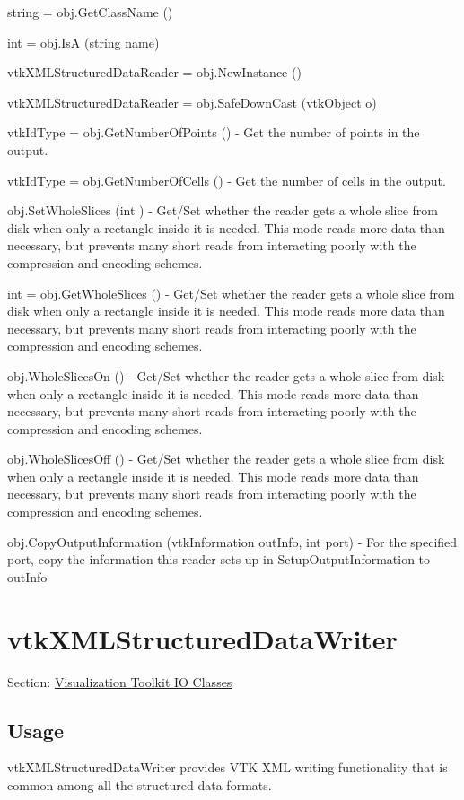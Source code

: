 \begin{DoxyItemize}
\item {\ttfamily string = obj.\-Get\-Class\-Name ()}  
\item {\ttfamily int = obj.\-Is\-A (string name)}  
\item {\ttfamily vtk\-X\-M\-L\-Structured\-Data\-Reader = obj.\-New\-Instance ()}  
\item {\ttfamily vtk\-X\-M\-L\-Structured\-Data\-Reader = obj.\-Safe\-Down\-Cast (vtk\-Object o)}  
\item {\ttfamily vtk\-Id\-Type = obj.\-Get\-Number\-Of\-Points ()} -\/ Get the number of points in the output.  
\item {\ttfamily vtk\-Id\-Type = obj.\-Get\-Number\-Of\-Cells ()} -\/ Get the number of cells in the output.  
\item {\ttfamily obj.\-Set\-Whole\-Slices (int )} -\/ Get/\-Set whether the reader gets a whole slice from disk when only a rectangle inside it is needed. This mode reads more data than necessary, but prevents many short reads from interacting poorly with the compression and encoding schemes.  
\item {\ttfamily int = obj.\-Get\-Whole\-Slices ()} -\/ Get/\-Set whether the reader gets a whole slice from disk when only a rectangle inside it is needed. This mode reads more data than necessary, but prevents many short reads from interacting poorly with the compression and encoding schemes.  
\item {\ttfamily obj.\-Whole\-Slices\-On ()} -\/ Get/\-Set whether the reader gets a whole slice from disk when only a rectangle inside it is needed. This mode reads more data than necessary, but prevents many short reads from interacting poorly with the compression and encoding schemes.  
\item {\ttfamily obj.\-Whole\-Slices\-Off ()} -\/ Get/\-Set whether the reader gets a whole slice from disk when only a rectangle inside it is needed. This mode reads more data than necessary, but prevents many short reads from interacting poorly with the compression and encoding schemes.  
\item {\ttfamily obj.\-Copy\-Output\-Information (vtk\-Information out\-Info, int port)} -\/ For the specified port, copy the information this reader sets up in Setup\-Output\-Information to out\-Info  
\end{DoxyItemize}\hypertarget{vtkio_vtkxmlstructureddatawriter}{}\section{vtk\-X\-M\-L\-Structured\-Data\-Writer}\label{vtkio_vtkxmlstructureddatawriter}
Section\-: \hyperlink{sec_vtkio}{Visualization Toolkit I\-O Classes} \hypertarget{vtkwidgets_vtkxyplotwidget_Usage}{}\subsection{Usage}\label{vtkwidgets_vtkxyplotwidget_Usage}
vtk\-X\-M\-L\-Structured\-Data\-Writer provides V\-T\-K X\-M\-L writing functionality that is common among all the structured data formats.

